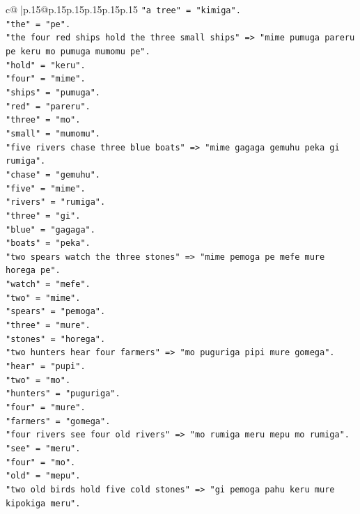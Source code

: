 \documentclass{article}
\begin{document}
{\begin{supertabular}{c@{$\;$}|p{.15\linewidth}@{}p{.15\linewidth}p{.15\linewidth}p{.15\linewidth}p{.15\linewidth}p{.15\linewidth}}
{{{\texttt{"a tree" = "kimiga".} \\
\texttt{"the" = "pe".} \\
\texttt{"the four red ships hold the three small ships" => "mime pumuga pareru pe keru mo pumuga mumomu pe".} \\
\texttt{"hold" = "keru".} \\
\texttt{"four" = "mime".} \\
\texttt{"ships" = "pumuga".} \\
\texttt{"red" = "pareru".} \\
\texttt{"three" = "mo".} \\
\texttt{"small" = "mumomu".} \\
\texttt{"five rivers chase three blue boats" => "mime gagaga gemuhu peka gi rumiga".} \\
\texttt{"chase" = "gemuhu".} \\
\texttt{"five" = "mime".} \\
\texttt{"rivers" = "rumiga".} \\
\texttt{"three" = "gi".} \\
\texttt{"blue" = "gagaga".} \\
\texttt{"boats" = "peka".} \\
\texttt{"two spears watch the three stones" => "mime pemoga pe mefe mure horega pe".} \\
\texttt{"watch" = "mefe".} \\
\texttt{"two" = "mime".} \\
\texttt{"spears" = "pemoga".} \\
\texttt{"three" = "mure".} \\
\texttt{"stones" = "horega".} \\
\texttt{"two hunters hear four farmers" => "mo puguriga pipi mure gomega".} \\
\texttt{"hear" = "pupi".} \\
\texttt{"two" = "mo".} \\
\texttt{"hunters" = "puguriga".} \\
\texttt{"four" = "mure".} \\
\texttt{"farmers" = "gomega".} \\
\texttt{"four rivers see four old rivers" => "mo rumiga meru mepu mo rumiga".} \\
\texttt{"see" = "meru".} \\
\texttt{"four" = "mo".} \\
\texttt{"old" = "mepu".} \\
\texttt{"two old birds hold five cold stones" => "gi pemoga pahu keru mure kipokiga meru".} \\
}}}
\end{supertabular}}
\end{document}
